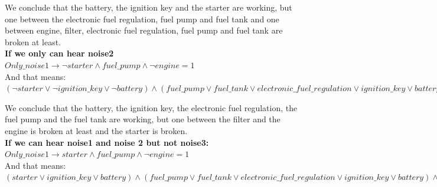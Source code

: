 \documentclass[paper=a4, fontsize=11pt]{scrartcl} %
\numberwithin{equation}{section} %
\numberwithin{figure}{section} %
\numberwithin{table}{section} %
\begin{document}
		
		We conclude that the battery, the ignition key and the starter are working, but one between the electronic fuel regulation, fuel pump and fuel tank and one between engine, filter, electronic fuel regulation, fuel pump and fuel tank are broken at least.\\
		
		
		
		

\textbf{If we only can hear noise2}\\
		
		$ Only\_noise1 \rightarrow  \lnot starter \land fuel\_pump \land \lnot engine = 1 $\\
		
		And that means: \\
		
	$ (\lnot starter \lor \lnot ignition\_key \lor \lnot battery) \land ( fuel\_pump \lor fuel\_tank \lor electronic\_fuel\_regulation \lor ignition\_key \lor battery) \land (\lnot engine \lor \lnot filter \lor \lnot fuel\_pump \lor \lnot fuel\_tank \lor \lnot electronic\_fuel\_regulation \lor \lnot ignition\_key \lor \lnot battery \lor \lnot starter \lor \lnot ignition\_key \lor \lnot battery) = 1 $
		
		
		We conclude that the battery, the ignition key, the electronic fuel regulation, the fuel pump and the fuel tank are working, but one between the filter and the engine is broken at least and the starter is broken.\\
		
		

\textbf{If we can hear noise1 and noise 2 but not noise3:}\\
		
		$ Only\_noise1 \rightarrow  starter \land fuel\_pump \land \lnot engine = 1 $\\
		
		And that means: \\
		
$ ( starter \lor  ignition\_key \lor  battery) \land ( fuel\_pump \lor fuel\_tank \lor electronic\_fuel\_regulation \lor ignition\_key \lor battery) \land (\lnot engine \lor \lnot filter \lor \lnot fuel\_pump \lor \lnot fuel\_tank \lor \lnot electronic\_fuel\_regulation \lor \lnot ignition\_key \lor \lnot battery \lor \lnot starter \lor \lnot ignition\_key \lor \lnot battery) = 1 $
		
\end{document}
